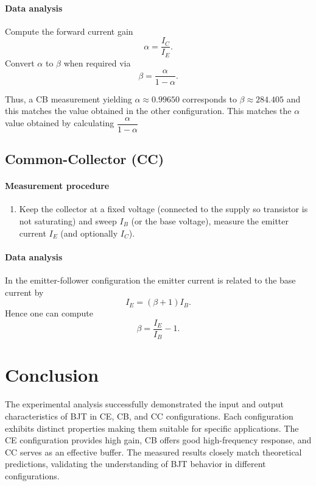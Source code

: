 \documentclass[12pt,a4paper]{article}
\begin{document}
\paragraph{Data analysis}
Compute the forward current gain
\begin{equation}
  \alpha = \frac{I_C}{I_E}.
\end{equation}
Convert $\alpha$ to $\beta$ when required via
\begin{equation}
  \beta = \frac{\alpha}{1-\alpha}.
\end{equation}

Thus, a CB measurement yielding $\alpha\approx 0.99650$ corresponds to $\beta\approx 284.405$ and this matches the value obtained in the other configuration. This matches the $\alpha$ value obtained by calculating $\dfrac{\alpha}{1-\alpha}$

\subsection{Common-Collector (CC)}
\paragraph{Measurement procedure}
\begin{enumerate}
  \item Keep the collector at a fixed voltage (connected to the supply so transistor is not saturating) and sweep $I_B$ (or the base voltage), measure the emitter current $I_E$ (and optionally $I_C$).
\end{enumerate}

\paragraph{Data analysis}
In the emitter-follower configuration the emitter current is related to the base current by
\begin{equation}
  I_E = (\beta+1)I_B.
\end{equation}
Hence one can compute
\begin{equation}
  \beta = \frac{I_E}{I_B} - 1.
\end{equation}

\section{Conclusion}

The experimental analysis successfully demonstrated the input and output characteristics of BJT in CE, CB, and CC configurations. Each configuration exhibits distinct properties making them suitable for specific applications. The CE configuration provides high gain, CB offers good high-frequency response, and CC serves as an effective buffer. The measured results closely match theoretical predictions, validating the understanding of BJT behavior in different configurations.
\end{document}
